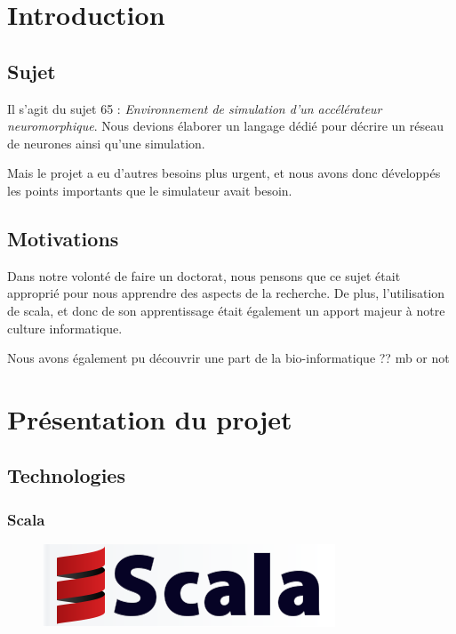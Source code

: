 \documentclass[a4paper,10pt]{article}
\begin{document}
\tableofcontents

\newpage


\section*{Introduction}

\subsection*{Sujet} 
    Il s’agit du sujet 65 : \emph{Environnement de simulation d'un accélérateur neuromorphique}. Nous devions élaborer un langage dédié pour décrire un réseau de neurones ainsi qu’une simulation.

Mais le projet a eu d’autres besoins plus urgent, et nous avons donc développés les points importants que le simulateur avait besoin.

\subsection*{Motivations}
    Dans notre volonté de faire un doctorat, nous pensons que ce sujet était approprié pour nous apprendre des aspects de la recherche. De plus, l’utilisation de scala, et donc de son apprentissage était également un apport majeur à notre culture informatique. 
		
		Nous avons également pu découvrir une part de la bio-informatique ?? mb or not

\newpage

\section{Présentation du projet}

\subsection{Technologies}

\subsubsection{Scala} 
\begin{figure}[h!]
\includegraphics[scale=0.15,right]{image/scala.png}
\end{figure}
\end{document}
